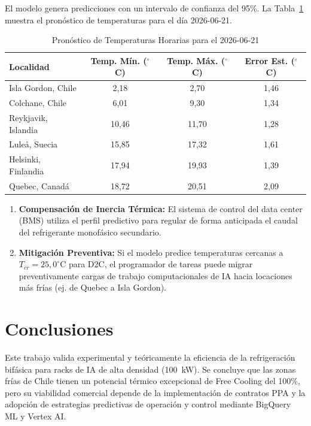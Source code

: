 \documentclass[journal]{IEEEtran}
\begin{document}
El modelo genera predicciones con un intervalo de confianza del 95\%. La Tabla~\ref{tab:forecast} muestra el pron\'ostico de temperaturas para el d\'ia 2026-06-21.

\begin{table}[htbp]
\caption{Pron\'ostico de Temperaturas Horarias para el 2026-06-21}
\label{tab:forecast}
\centering
\begin{tabular}{lccc}
\toprule
Localidad & Temp. M\'in. ($^\circ$C) & Temp. M\'ax. ($^\circ$C) & Error Est. ($^\circ$C) \\
\midrule
Isla Gordon, Chile & 2,18 & 2,70 & 1,46 \\
Colchane, Chile & 6,01 & 9,30 & 1,34 \\
Reykjavik, Islandia & 10,46 & 11,70 & 1,28 \\
Lule\aa, Suecia & 15,85 & 17,32 & 1,61 \\
Helsinki, Finlandia & 17,94 & 19,93 & 1,39 \\
Quebec, Canad\'a & 18,72 & 20,51 & 2,09 \\
\bottomrule
\end{tabular}
\end{table}

\begin{enumerate}
    \item \textbf{Compensaci\'on de Inercia T\'ermica:} El sistema de control del data center (BMS) utiliza el perfil predictivo para regular de forma anticipada el caudal del refrigerante monof\'asico secundario.
    \item \textbf{Mitigaci\'on Preventiva:} Si el modelo predice temperaturas cercanas a $T_{cr} = 25,0^\circ\text{C}$ para D2C, el programador de tareas puede migrar preventivamente cargas de trabajo computacionales de IA hacia locaciones m\'as fr\'ias (ej. de Quebec a Isla Gordon).
\end{enumerate}

\section{Conclusiones}
Este trabajo valida experimental y te\'oricamente la eficiencia de la refrigeraci\'on bif\'asica para racks de IA de alta densidad (100~kW). Se concluye que las zonas fr\'ias de Chile tienen un potencial t\'ermico excepcional de Free Cooling del 100\%, pero su viabilidad comercial depende de la implementaci\'on de contratos PPA y la adopci\'on de estrategias predictivas de operaci\'on y control mediante BigQuery ML y Vertex AI.
\end{document}
